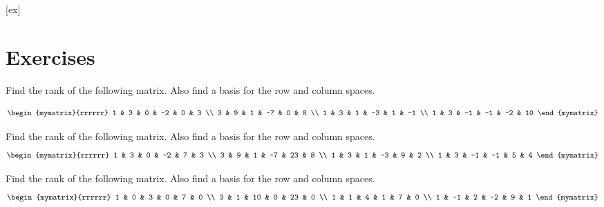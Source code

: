 [ex]
\section*{Exercises}

\begin{enumialphparenastyle}

\begin{ex} Find the rank of the following matrix. Also find a basis for the row
and column spaces.

\begin{equation*}
\begin{mymatrix}{rrrrrr}
1 & 3 & 0 & -2 & 0 & 3 \\ 
3 & 9 & 1 & -7 & 0 & 8 \\ 
1 & 3 & 1 & -3 & 1 & -1 \\ 
1 & 3 & -1 & -1 & -2 & 10
\end{mymatrix} 
\end{equation*}
\end{ex}

\begin{ex} Find the rank of the following matrix. Also find a basis for the row
and column spaces.
\begin{equation*}
\begin{mymatrix}{rrrrrr}
1 & 3 & 0 & -2 & 7 & 3 \\ 
3 & 9 & 1 & -7 & 23 & 8 \\ 
1 & 3 & 1 & -3 & 9 & 2 \\ 
1 & 3 & -1 & -1 & 5 & 4
\end{mymatrix} 
\end{equation*}
\end{ex}

\begin{ex} Find the rank of the following matrix. Also find a basis for the row
and column spaces.
\begin{equation*}
\begin{mymatrix}{rrrrrr}
1 & 0 & 3 & 0 & 7 & 0 \\ 
3 & 1 & 10 & 0 & 23 & 0 \\ 
1 & 1 & 4 & 1 & 7 & 0 \\ 
1 & -1 & 2 & -2 & 9 & 1
\end{mymatrix}
\end{equation*}
\end{ex}


\end{enumialphparenastyle}
